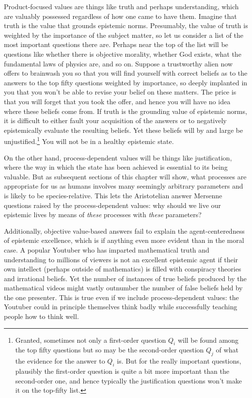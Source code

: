 Product-focused values are things like truth and perhaps understanding, which are valuably possessed
regardless of how one came to have them. Imagine that truth is the value that grounds epistemic norms.
Presumably, the value of truth is weighted by the importance of the subject matter, so let us consider
a list of the most important questions there are. Perhaps near the top of the list will be questions
like whether there is objective morality, whether God exists, what the fundamental laws of physics
are, and so on. Suppose a trustworthy alien now offers to brainwash you so that you will find yourself
with correct beliefs as to the answers to the top fifty questions weighted by importance, so deeply 
implanted in you that you won't be able to revise your belief on these matters. The price is that you
will forget that you took the offer, and hence you will have no idea where these beliefs come from.
If truth is the grounding value of epistemic norms, it is difficult to either
fault your acquisition of the answers or to negatively epistemically evaluate the resulting beliefs. Yet 
these beliefs will by and large be unjustified.\footnote{Granted, sometimes not only a first-order question $Q_i$ 
will be found among the top fifty questions but so may be the second-order question $Q_j$ of what the evidence for
the answer to $Q_i$ is. But for the really important questions, plausibly the first-order question is
quite a bit more important than the second-order one, and hence typically the justification questions won't
make it on the top-fifty list.} You will not be in a healthy epistemic state. 

On the other hand, process-dependent values will be things like justification, where the way in which
the state has been achieved is essential to its being valuable. But as subsequent sections of this
chapter will show, what processes are appropriate for us as humans involves many seemingly arbitrary
parameters and is likely to be species-relative. This lets the Aristotelian answer Mersenne
questions raised by the process-dependent values: why should we live our epistemic lives by means
of \textit{these} processes with \textit{these} parameters?

Additionally, objective value-based answers fail to explain the agent-centeredness of epistemic excellence, 
which is if anything even more evident than in the moral case. A popular Youtuber who has imparted 
mathematical truth and understanding to millions of viewers is not an excellent epistemic agent if 
their own intellect (perhaps outside of mathematics) is filled with conspiracy theories and irrational 
beliefs. Yet the number of instances of true beliefs produced by the mathematical videos might vastly 
outnumber the number of false beliefs held by the one presenter. This is true even if we include 
process-dependent values: the Youtuber could in principle themselves think badly while successfully teaching 
people how to think well. 

